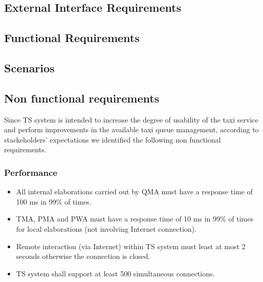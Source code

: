 
\subsection{External Interface Requirements }



\clearpage{}


\subsection{Functional Requirements }



\clearpage{}


\subsection{Scenarios}



\clearpage{}



\clearpage{}



\clearpage{}


\subsection{Non functional requirements}

Since TS system is intended to increase the degree of usability of
the taxi service and perform improvements in the available taxi queue
management, according to stackeholders' expectations we identified
the following non functional requirements.


\subsubsection{Performance}
\begin{itemize}
\item All internal elaborations carried out by QMA must have a response
time of 100 ms in 99\% of times.
\item TMA, PMA and PWA must have a response time of 10 ms in 99\% of times
for local elaborations (not involving Internet connection).
\item Remote interaction (via Internet) within TS system must least at most
2 seconds otherwise the connection is closed.
\item TS system shall support at least 500 simultaneous connections.
\end{itemize}

